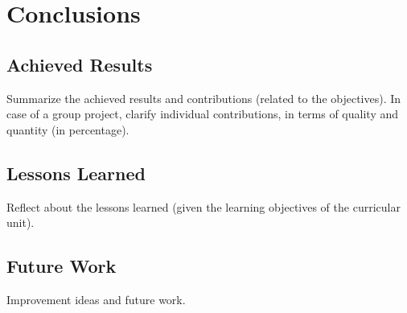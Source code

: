 \section{Conclusions}
\label{section:conclusion}

\subsection{Achieved Results} 	

Summarize the achieved results and contributions (related to the objectives).
In case of a group project, clarify individual contributions, in terms of quality and quantity (in percentage).

\subsection{Lessons Learned} 	

Reflect about the lessons learned (given the learning objectives of the curricular unit).

\subsection{Future Work} 

Improvement ideas and future work.
